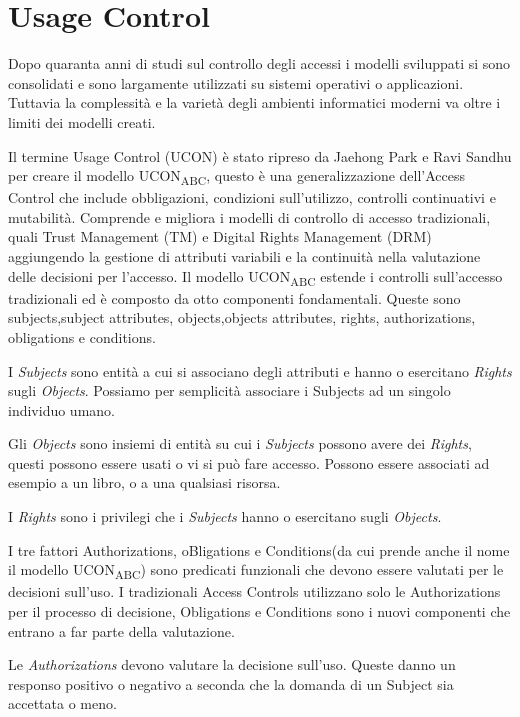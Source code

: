\section{Usage Control}
\label{sec:Usage Control}
Dopo quaranta anni di studi sul controllo degli accessi i modelli sviluppati si sono consolidati e sono largamente utilizzati
su sistemi operativi o applicazioni. Tuttavia la complessità e la varietà degli ambienti informatici moderni va oltre i limiti
dei modelli creati.\par
Il termine Usage Control (UCON) è stato ripreso da Jaehong Park e Ravi Sandhu per creare il modello UCON\textsubscript{ABC}\cite{ucon},
questo è una generalizzazione dell'Access Control che include obbligazioni, condizioni sull'utilizzo,
controlli continuativi e mutabilità. Comprende e migliora i modelli di controllo di accesso tradizionali, quali Trust
Management (TM) e Digital Rights Management (DRM) aggiungendo la gestione di attributi variabili e la continuità nella valutazione
delle decisioni per l'accesso. Il modello UCON\textsubscript{ABC} estende i controlli sull'accesso tradizionali ed è composto da otto componenti fondamentali.
Queste sono subjects,subject attributes, objects,objects attributes, rights, authorizations, obligations e conditions.\par
{}
I \emph{Subjects} sono entità a cui si associano degli attributi e hanno o esercitano \emph{Rights} sugli \emph{Objects}. Possiamo per semplicità
associare i Subjects ad un singolo individuo umano.\par
Gli \emph{Objects} sono insiemi di entità su cui i \emph{Subjects} possono avere dei \emph{Rights}, questi possono essere usati o vi si può
fare accesso. Possono essere associati ad esempio a un libro, o a una qualsiasi risorsa.\par
I \emph{Rights} sono i privilegi che i \emph{Subjects} hanno o esercitano sugli \emph{Objects}.\par
I tre fattori Authorizations, oBligations e Conditions(da cui prende anche il
nome il modello UCON\textsubscript{ABC}) sono predicati funzionali che devono essere valutati per le decisioni sull'uso.
I tradizionali Access Controls utilizzano solo le Authorizations per il processo di decisione, Obligations e Conditions
sono i nuovi componenti che entrano a far parte della valutazione.\par
Le \emph{Authorizations} devono valutare la decisione sull'uso. Queste danno un responso positivo
o negativo a seconda che la domanda di un Subject sia accettata o meno.\par
